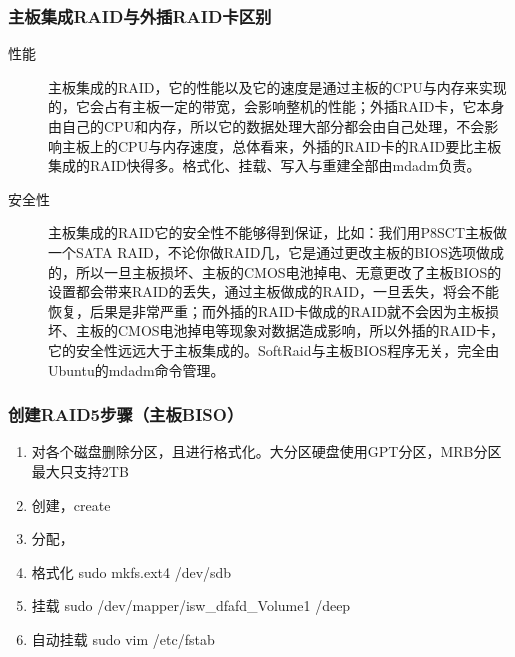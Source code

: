 \subsubsection{主板集成RAID与外插RAID卡区别}
\begin{description}
\item[性能] 主板集成的RAID，它的性能以及它的速度是通过主板的CPU与内存来实现的，它会占有主板一定的带宽，会影响整机的性能；外插RAID卡，它本身由自己的CPU和内存，所以它的数据处理大部分都会由自己处理，不会影响主板上的CPU与内存速度，总体看来，外插的RAID卡的RAID要比主板集成的RAID快得多。格式化、挂载、写入与重建全部由mdadm负责。
\item[安全性] 主板集成的RAID它的安全性不能够得到保证，比如：我们用P8SCT主板做一个SATA RAID，不论你做RAID几，它是通过更改主板的BIOS选项做成的，所以一旦主板损坏、主板的CMOS电池掉电、无意更改了主板BIOS的设置都会带来RAID的丢失，通过主板做成的RAID，一旦丢失，将会不能恢复，后果是非常严重；而外插的RAID卡做成的RAID就不会因为主板损坏、主板的CMOS电池掉电等现象对数据造成影响，所以外插的RAID卡，它的安全性远远大于主板集成的。SoftRaid与主板BIOS程序无关，完全由Ubuntu的mdadm命令管理。
\end{description}


\subsubsection{创建RAID5步骤（主板BISO）}
\begin{enumerate}
\item 对各个磁盘删除分区，且进行格式化。大分区硬盘使用GPT分区，MRB分区最大只支持2TB
\item 创建，create
\item 分配，
\item 格式化 sudo mkfs.ext4 /dev/sdb
\item 挂载 sudo /dev/mapper/isw\_dfafd\_Volume1 /deep
\item 自动挂载 sudo vim /etc/fstab
\end{enumerate}

